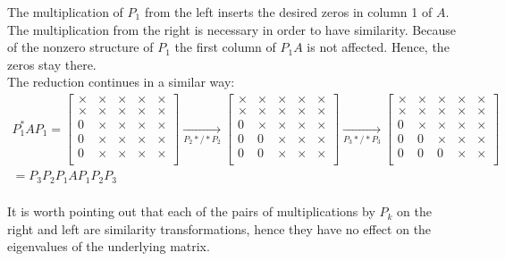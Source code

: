 The multiplication of $P_1$ from the left inserts the desired zeros in column 1 of $A$. The
multiplication from the right is necessary in order to have similarity. Because of the
nonzero structure of $P_1$ the first column of $P_1A$ is not affected. Hence, the zeros stay
there.
\\
The reduction continues in a similar way:
\begin{multline}
    P_1^*AP_1 = \begin{bmatrix}
        \times & \times & \times& \times& \times\\
        \times & \times & \times& \times& \times\\
        0 & \times & \times& \times& \times\\
        0 & \times & \times& \times& \times\\
        0 & \times & \times& \times& \times\\
    \end{bmatrix} \xrightarrow[P_2*/*P_2]{} \begin{bmatrix}
        \times & \times & \times& \times& \times\\
        \times & \times & \times& \times& \times\\
        0 & \times & \times& \times& \times\\
        0 & 0 & \times& \times& \times\\
        0 & 0 & \times& \times& \times\\
    \end{bmatrix} 
    \xrightarrow[P_3*/*P_3]{} \begin{bmatrix}
        \times & \times & \times& \times& \times\\
        \times & \times & \times& \times& \times\\
        0 & \times & \times& \times& \times\\
        0 & 0 & \times& \times& \times\\
        0 & 0 & 0& \times& \times\\
    \end{bmatrix}\\ = P_3P_2P_1AP_1P_2P_3
\end{multline}
\\
It is worth pointing out that each of the pairs of multiplications by $P_k$ on the right and left are similarity transformations, hence they have no effect on the eigenvalues of the underlying matrix.
